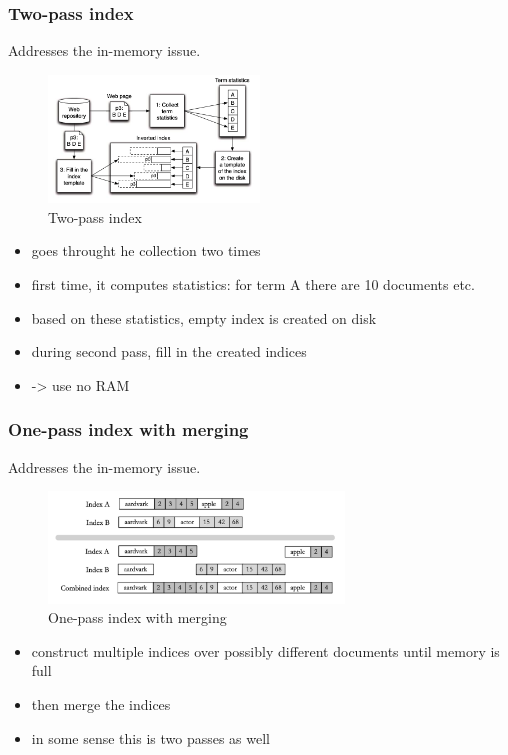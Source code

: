 \subsubsection{Two-pass index}
Addresses the in-memory issue.
\begin{figure}[ht]
    \centering
    \includegraphics[width=0.5\textwidth]{figures/two-pass_index.png}
    \caption{Two-pass index}
\end{figure}
\begin{itemize}
    \item goes throught he collection two times
    \item first time, it computes statistics: for term A there are 10 documents etc.
    \item based on these statistics, empty index is created on disk
    \item during second pass, fill in the created indices
    \item -> use no RAM
\end{itemize}

\subsubsection{One-pass index with merging}
Addresses the in-memory issue.
\begin{figure}[ht]
    \centering
    \includegraphics[width=0.7\textwidth]{figures/one-pass_index_merge.png}
    \caption{One-pass index with merging}
\end{figure}
\begin{itemize}
    \item construct multiple indices over possibly different documents until memory is full
    \item then merge the indices
    \item in some sense this is two passes as well
\end{itemize}

